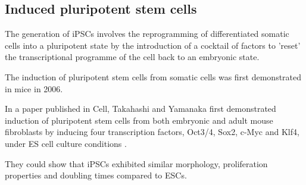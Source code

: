 




\subsection{Induced pluripotent stem cells}
\label{sec:ipsc}


The generation of iPSCs involves the reprogramming of differentiated somatic cells into a pluripotent state by the introduction of a cocktail of factors to 'reset' the transcriptional programme of the cell back to an embryonic state. 

The induction of pluripotent stem cells from somatic cells was first demonstrated in mice in 2006.

In a paper published in Cell, Takahashi and Yamanaka first demonstrated induction of pluripotent stem cells from both embryonic and adult mouse fibroblasts by inducing four transcription factors, Oct3/4, Sox2, c-Myc and Klf4, under ES cell culture conditions
\cite{takahashi2006induction}.

They could show that iPSCs exhibited similar morphology, proliferation properties and doubling times compared to ESCs.




